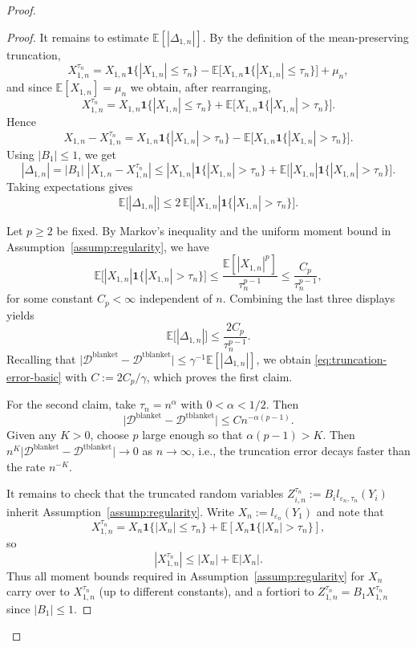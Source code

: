 \documentclass{article}
\theoremstyle{plain}
\theoremstyle{definition}
\begin{document}
\begin{proof}
\begin{proof}
It remains to estimate $\mathbb E[|\Delta_{1,n}|]$.
By the definition of the mean-preserving truncation,
\[
  X_{1,n}^{\tau_n}
  = X_{1,n}\mathbf 1\{|X_{1,n}|\le \tau_n\}
    - \mathbb E\bigl[X_{1,n}\mathbf 1\{|X_{1,n}|\le \tau_n\}\bigr]
    + \mu_n,
\]
and since $\mathbb E[X_{1,n}] = \mu_n$ we obtain, after rearranging,
\[
  X_{1,n}^{\tau_n}
  = X_{1,n}\mathbf 1\{|X_{1,n}|\le \tau_n\}
    + \mathbb E\bigl[X_{1,n}\mathbf 1\{|X_{1,n}|> \tau_n\}\bigr].
\]
Hence
\[
  X_{1,n} - X_{1,n}^{\tau_n}
  = X_{1,n}\mathbf 1\{|X_{1,n}|>\tau_n\}
    - \mathbb E\bigl[X_{1,n}\mathbf 1\{|X_{1,n}|>\tau_n\}\bigr].
\]
Using $|B_1|\le1$, we get
\[
  |\Delta_{1,n}|
  = |B_1|\;|X_{1,n} - X_{1,n}^{\tau_n}|
  \le |X_{1,n}|\mathbf 1\{|X_{1,n}|>\tau_n\}
       + \mathbb E\bigl[|X_{1,n}|\mathbf 1\{|X_{1,n}|>\tau_n\}\bigr].
\]
Taking expectations gives
\[
  \mathbb E\bigl[|\Delta_{1,n}|\bigr]
  \le 2\,\mathbb E\bigl[|X_{1,n}|\mathbf 1\{|X_{1,n}|>\tau_n\}\bigr].
\]

Let $p\ge 2$ be fixed. By Markov's inequality and the
uniform moment bound in Assumption~\ref{assump:regularity}, we have
\[
  \mathbb E\bigl[|X_{1,n}|\mathbf 1\{|X_{1,n}|>\tau_n\}\bigr]
  \le \frac{\mathbb E[|X_{1,n}|^p]}{\tau_n^{p-1}}
  \le \frac{C_p}{\tau_n^{p-1}},
\]
for some constant $C_p<\infty$ independent of $n$.
Combining the last three displays yields
\[
  \mathbb E\bigl[|\Delta_{1,n}|\bigr]
  \le \frac{2C_p}{\tau_n^{p-1}}.
\]
Recalling that
\(
  \bigl|\mathcal D^{\mathrm{blanket}}
        - \mathcal D^{\mathrm{tblanket}}\bigr|
  \le \gamma^{-1}\mathbb E[|\Delta_{1,n}|]
\),
we obtain \eqref{eq:truncation-error-basic} with
$C := 2C_p/\gamma$, which proves the first claim.

For the second claim, take $\tau_n = n^\alpha$ with $0<\alpha<1/2$. Then
\[
  \bigl|\mathcal D^{\mathrm{blanket}}
        - \mathcal D^{\mathrm{tblanket}}\bigr|
  \le C n^{-\alpha(p-1)}.
\]
Given any $K>0$, choose $p$ large enough so that
$\alpha(p-1) > K$. Then
\(
  n^K
  \bigl|\mathcal D^{\mathrm{blanket}}
        - \mathcal D^{\mathrm{tblanket}}\bigr|
  \to 0
\)
as $n\to\infty$, i.e., the truncation error decays faster than
the rate $n^{-K}$.

It remains to check that the truncated random variables
$Z_{i,n}^{\tau_n} := B_i l_{\varepsilon_n,\tau_n}(Y_i)$ inherit
Assumption~\ref{assump:regularity}.
Write $X_n := l_{\varepsilon_n}(Y_1)$ and note that
\[
  X_{1,n}^{\tau_n}
  = X_n \mathbf{1}\{|X_n|\le \tau_n\}
    + \mathbb{E}[X_n \mathbf{1}\{|X_n|>\tau_n\}],
\]
so
\[
  |X_{1,n}^{\tau_n}|
  \le |X_n| + \mathbb{E}|X_n|.
\]
Thus all moment bounds required in
Assumption~\ref{assump:regularity} for $X_n$ carry over
to $X_{1,n}^{\tau_n}$ (up to different constants), and a fortiori to
$Z_{1,n}^{\tau_n} = B_1 X_{1,n}^{\tau_n}$ since $|B_1|\le1$.


\end{proof}
\end{proof}
\end{document}
